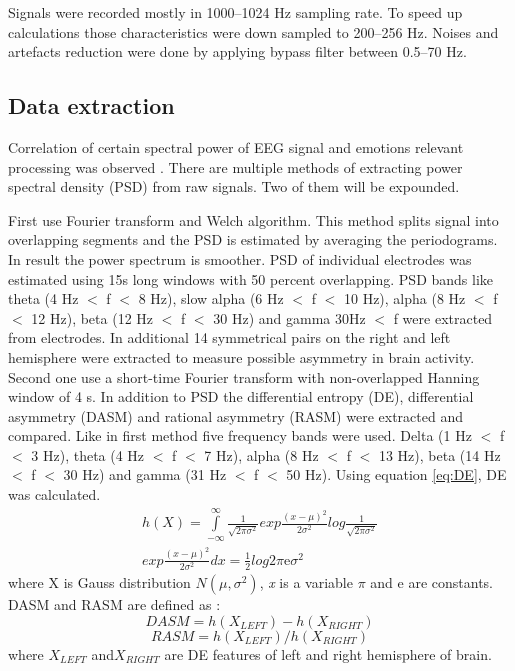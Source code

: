 \documentclass[10pt,journal,compsoc,twoside]{IEEEtran}
\newcommand{\Ref}[2]{#2 \ref{#1}}
\newcommand{\fromto}[5]{(#1 #3 $<$ #4 $<$ #2 #3)}
\newcommand{\me}{\mathrm{e}}
\begin{document}
Signals were recorded mostly in \numrange[range-phrase = --]{1000}{1024} Hz sampling rate. To speed up calculations those characteristics were down sampled to \numrange[range-phrase = --]{200}{256} Hz. Noises and artefacts reduction were done by applying bypass filter between  \numrange{0.5}{70} Hz.
\subsection{Data extraction}
Correlation of certain spectral power of EEG signal and emotions relevant processing was observed \cite{AftanasSavotinaMakhnev2005}. There are multiple methods of extracting power spectral density (PSD) from raw signals. Two of them will be expounded.

First \cite{WeiLongBoNanBaoLiang2014} use Fourier transform and Welch algorithm. This method splits signal into overlapping segments and the PSD is estimated by averaging the periodograms. In result the power spectrum is smoother. PSD of individual electrodes was estimated using 15s long windows with 50 percent overlapping. PSD bands like theta \fromto{4}{8}{Hz}{f} \  ,  slow alpha \fromto{6}{10}{Hz}{f} \  ,  alpha \fromto{8}{12}{Hz}{f} \  ,  beta \fromto{12}{30}{Hz}{f} \\  and  gamma 30Hz $<$ f were extracted from electrodes. In additional 14 symmetrical pairs on the right and left hemisphere were extracted to measure possible asymmetry in brain activity.
\newline
\newline
Second one use a short-time Fourier transform with non-overlapped Hanning window of 4 s. In addition to PSD the differential entropy (DE), differential asymmetry (DASM) and rational asymmetry (RASM) were extracted and compared. Like in first method five frequency bands were used. Delta \fromto{1}{3}{Hz}{f} \  ,  theta \fromto{4}{7}{Hz}{f} \  ,  alpha \fromto{8}{13}{Hz}{f} \  ,  beta \fromto{14}{30}{Hz}{f} \\ and  gamma \fromto{31}{50}{Hz}{f} \,. Using \Ref{eq:DE}{equation}, DE was calculated.
\begin{equation}
\begin{aligned}
h(X)=\int\limits_{-\infty}^{\infty} \frac{1}{\sqrt{2\pi\sigma^{2}}}exp \frac{(x - \mu)^{2}}{2\sigma^{2}}log\frac{1}{\sqrt{2\pi\sigma^{2}}}\\ exp\frac{(x - \mu)^{2}}{2\sigma^{2}}dx = \frac{1}{2}log2\pi \me \sigma^{2}
\end{aligned}
\label{eq:DE}
\end{equation}
where X is Gauss distribution $N(\mu, \sigma^2)$, \textit{x} is a variable $\pi$ and $\me$ are constants. DASM and RASM are defined as :
\begin{equation}
DASM = h(X_{LEFT}) - h(X_{RIGHT})
\end{equation}
\begin{equation}
RASM = h(X_{LEFT}) / h(X_{RIGHT})
\end{equation}
where $X_{LEFT}$ and$X_{RIGHT}$ are DE features of left and right hemisphere of brain.
\newpage
\end{document}
